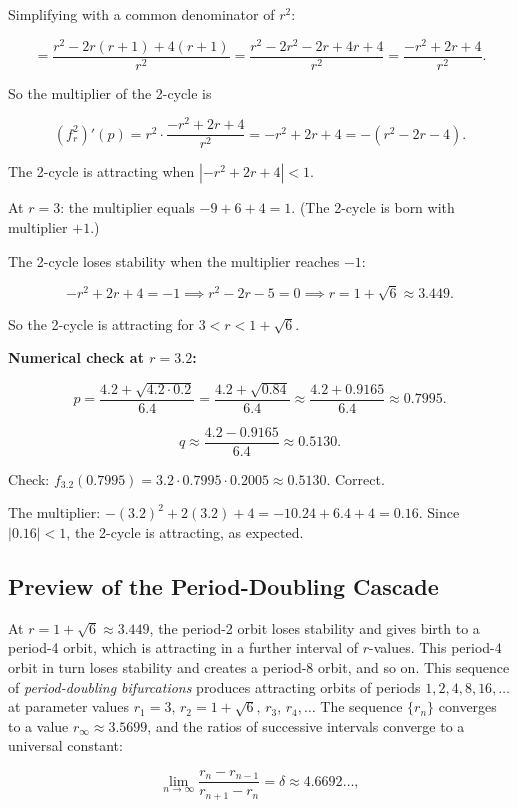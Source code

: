 Simplifying with a common denominator of $r^2$:

\[
= \frac{r^2 - 2r(r+1) + 4(r+1)}{r^2} = \frac{r^2 - 2r^2 - 2r + 4r + 4}{r^2} = \frac{-r^2 + 2r + 4}{r^2}.
\]

So the multiplier of the 2-cycle is

\[
(f_r^2)'(p) = r^2 \cdot \frac{-r^2 + 2r + 4}{r^2} = -r^2 + 2r + 4 = -(r^2 - 2r - 4).
\]

The 2-cycle is attracting when $|{-r^2 + 2r + 4}| < 1$.

At $r = 3$: the multiplier equals $-9 + 6 + 4 = 1$. (The 2-cycle is born with multiplier $+1$.)

The 2-cycle loses stability when the multiplier reaches $-1$:

\[
-r^2 + 2r + 4 = -1 \implies r^2 - 2r - 5 = 0 \implies r = 1 + \sqrt{6} \approx 3.449.
\]

So the 2-cycle is attracting for $3 < r < 1 + \sqrt{6}$.

\textbf{Numerical check at $r = 3.2$:}

\[
p = \frac{4.2 + \sqrt{4.2 \cdot 0.2}}{6.4} = \frac{4.2 + \sqrt{0.84}}{6.4} \approx \frac{4.2 + 0.9165}{6.4} \approx 0.7995.
\]

\[
q \approx \frac{4.2 - 0.9165}{6.4} \approx 0.5130.
\]

Check: $f_{3.2}(0.7995) = 3.2 \cdot 0.7995 \cdot 0.2005 \approx 0.5130$. Correct.

The multiplier: $-(3.2)^2 + 2(3.2) + 4 = -10.24 + 6.4 + 4 = 0.16$. Since $|0.16| < 1$, the 2-cycle is attracting, as expected.

\subsection{Preview of the Period-Doubling Cascade}\label{sec:2.4.4}

At $r = 1 + \sqrt{6} \approx 3.449$, the period-2 orbit loses stability and gives birth to a period-4 orbit, which is attracting in a further interval of $r$-values. This period-4 orbit in turn loses stability and creates a period-8 orbit, and so on. This sequence of \textit{period-doubling bifurcations} produces attracting orbits of periods $1, 2, 4, 8, 16, \ldots$ at parameter values $r_1 = 3, \, r_2 = 1 + \sqrt{6}, \, r_3, \, r_4, \ldots$ The sequence $\{r_n\}$ converges to a value $r_\infty \approx 3.5699$, and the ratios of successive intervals converge to a universal constant:

\[
\lim_{n \to \infty} \frac{r_n - r_{n-1}}{r_{n+1} - r_n} = \delta \approx 4.6692\ldots,
\]

